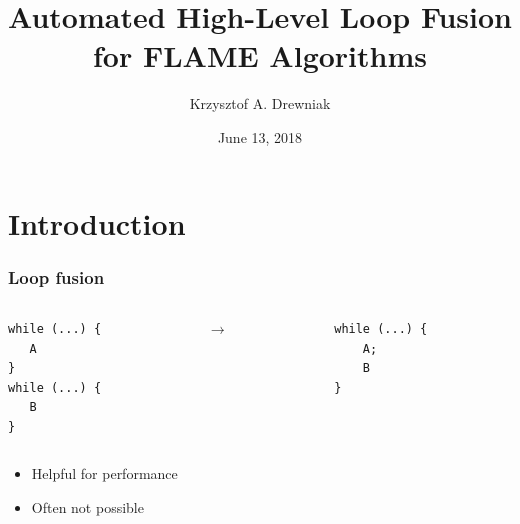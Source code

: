 \documentclass{beamer}
\title[Loop fusion]{Automated High-Level Loop Fusion for FLAME Algorithms}
\author[Drewniak]{Krzysztof A. Drewniak}
\institute[CMU]{Carnegie Mellon University}
\date[]{June 13, 2018}
\begin{document}
\begin{frame}[plain]
  \titlepage{}
\end{frame}

\section{Introduction}

\begin{frame}[fragile]
  \frametitle{Loop fusion}
  \begin{columns}
    \begin{column}{0.45\textwidth}
\begin{verbatim}
while (...) {
   A
}
while (...) {
   B
}
\end{verbatim}
    \end{column}
    \begin{column}{0.1\textwidth}
      {\Large $\to$}
    \end{column}
    \begin{column}{0.45\textwidth}
\begin{verbatim}
while (...) {
    A;
    B
}
\end{verbatim}
    \end{column}
  \end{columns}

  \vspace*{2em}
  \begin{itemize}
  \item Helpful for performance
  \item Often not possible
  \end{itemize}
\end{frame}
\end{document}
